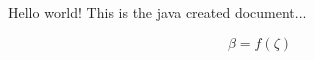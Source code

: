 \documentclass[10pt]{article}
\begin{document}
Hello world! This is the java created document...

\begin{equation}
\beta = f(\zeta)
\end{equation}
\end{document}
